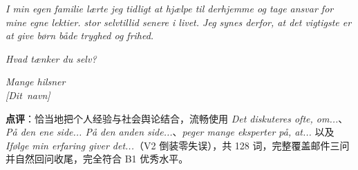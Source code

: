 \begin{answerbox}
\textit{I min egen familie lærte jeg tidligt at hjælpe til derhjemme og tage ansvar for mine egne lektier.   stor selvtillid senere i livet. Jeg synes derfor, at det vigtigste er at give børn både tryghed og frihed.}

\textit{Hvad tænker du selv?}

\textit{Mange hilsner\\
\mbox{[Dit navn]}}

\small\textbf{点评}：恰当地把个人经验与社会舆论结合，流畅使用 \textit{Det diskuteres ofte, om...}、\textit{På den ene side... På den anden side...}、\textit{peger mange eksperter på, at...} 以及 \textit{Ifølge min erfaring giver det...}（V2 倒装零失误），共 128 词，完整覆盖邮件三问并自然回问收尾，完全符合 B1 优秀水平。
\end{answerbox}